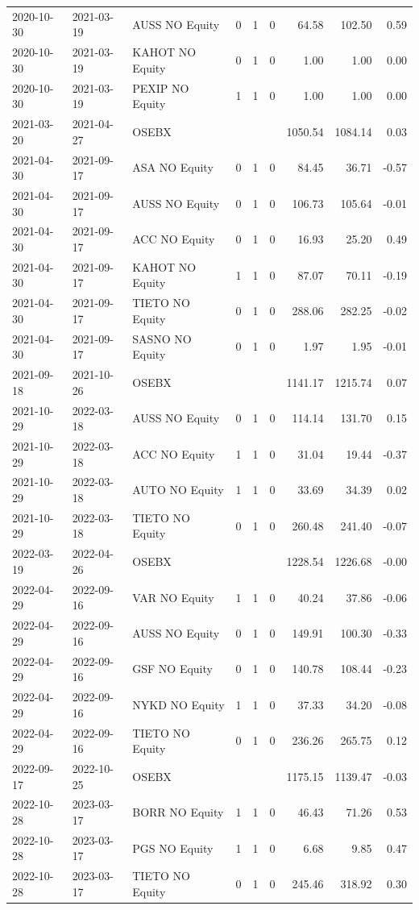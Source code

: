 \begin{appendices}
\begin{table}[H]
\begin{tabular}{llllllrrr}
   2020-10-30 & 2021-03-19 & AUSS NO Equity & 0 & 1 & 0 & 64.58 & 102.50 & 0.59 \\ 
   2020-10-30 & 2021-03-19 & KAHOT NO Equity & 0 & 1 & 0 & 1.00 & 1.00 & 0.00 \\ 
   2020-10-30 & 2021-03-19 & PEXIP NO Equity & 1 & 1 & 0 & 1.00 & 1.00 & 0.00 \\ 
   2021-03-20 & 2021-04-27 & OSEBX &  &  &  & 1050.54 & 1084.14 & 0.03 \\ 
   2021-04-30 & 2021-09-17 & ASA NO Equity & 0 & 1 & 0 & 84.45 & 36.71 & -0.57 \\ 
   2021-04-30 & 2021-09-17 & AUSS NO Equity & 0 & 1 & 0 & 106.73 & 105.64 & -0.01 \\ 
   2021-04-30 & 2021-09-17 & ACC NO Equity & 0 & 1 & 0 & 16.93 & 25.20 & 0.49 \\ 
   2021-04-30 & 2021-09-17 & KAHOT NO Equity & 1 & 1 & 0 & 87.07 & 70.11 & -0.19 \\ 
   2021-04-30 & 2021-09-17 & TIETO NO Equity & 0 & 1 & 0 & 288.06 & 282.25 & -0.02 \\ 
   2021-04-30 & 2021-09-17 & SASNO NO Equity & 0 & 1 & 0 & 1.97 & 1.95 & -0.01 \\ 
   2021-09-18 & 2021-10-26 & OSEBX &  &  &  & 1141.17 & 1215.74 & 0.07 \\ 
   2021-10-29 & 2022-03-18 & AUSS NO Equity & 0 & 1 & 0 & 114.14 & 131.70 & 0.15 \\ 
   2021-10-29 & 2022-03-18 & ACC NO Equity & 1 & 1 & 0 & 31.04 & 19.44 & -0.37 \\ 
   2021-10-29 & 2022-03-18 & AUTO NO Equity & 1 & 1 & 0 & 33.69 & 34.39 & 0.02 \\ 
   2021-10-29 & 2022-03-18 & TIETO NO Equity & 0 & 1 & 0 & 260.48 & 241.40 & -0.07 \\ 
   2022-03-19 & 2022-04-26 & OSEBX &  &  &  & 1228.54 & 1226.68 & -0.00 \\ 
   2022-04-29 & 2022-09-16 & VAR NO Equity & 1 & 1 & 0 & 40.24 & 37.86 & -0.06 \\ 
   2022-04-29 & 2022-09-16 & AUSS NO Equity & 0 & 1 & 0 & 149.91 & 100.30 & -0.33 \\ 
   2022-04-29 & 2022-09-16 & GSF NO Equity & 0 & 1 & 0 & 140.78 & 108.44 & -0.23 \\ 
   2022-04-29 & 2022-09-16 & NYKD NO Equity & 1 & 1 & 0 & 37.33 & 34.20 & -0.08 \\ 
   2022-04-29 & 2022-09-16 & TIETO NO Equity & 0 & 1 & 0 & 236.26 & 265.75 & 0.12 \\ 
   2022-09-17 & 2022-10-25 & OSEBX &  &  &  & 1175.15 & 1139.47 & -0.03 \\ 
   2022-10-28 & 2023-03-17 & BORR NO Equity & 1 & 1 & 0 & 46.43 & 71.26 & 0.53 \\ 
   2022-10-28 & 2023-03-17 & PGS NO Equity & 1 & 1 & 0 & 6.68 & 9.85 & 0.47 \\ 
   2022-10-28 & 2023-03-17 & TIETO NO Equity & 0 & 1 & 0 & 245.46 & 318.92 & 0.30 \\ 
   

\end{tabular}
\end{table}
\end{appendices}
